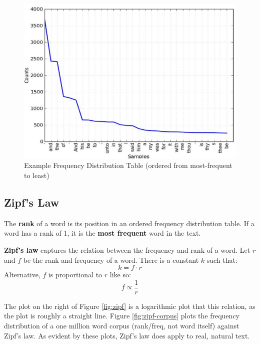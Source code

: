 \documentclass{article}
\begin{document}
\begin{figure}
	\centering
	\includegraphics[scale=0.4]{figures/frequency-distribution.png}
	\caption{Example Frequency Distribution Table (ordered from most-frequent to least)}
	\label{fig:freqdist}
\end{figure}

\subsection{Zipf's Law}

The \textbf{rank} of a word is its position in an ordered frequency distribution table. If a word has a rank of 1, it is the \textbf{most frequent} word in the text.

\textbf{Zipf's law} captures the relation between the frequency and rank of a word. Let $r$ and $f$ be the rank and frequency of a word. There is a constant $k$ such that:
\begin{equation}
	k = f \cdot r
\end{equation}
Alternative, $f$ is proportional to $r$ like so:
\begin{equation}
	f \propto \frac{1}{r}
\end{equation}

The plot on the right of Figure \ref{fig:zipf} is a logarithmic plot that this relation, as the plot is roughly a straight line. Figure \ref{fig:zipf-corpus} plots the frequency distribution of a one million word corpus (rank/freq, not word itself) against Zipf's law. As evident by these plots, Zipf's law does apply to real, natural text.
\end{document}
